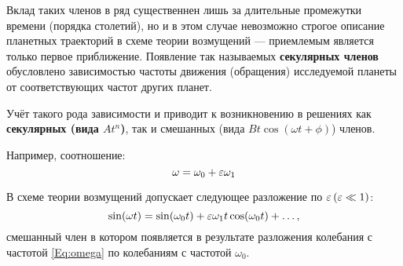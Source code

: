 Вклад таких членов в ряд существеннен лишь
за длительные промежутки времени (порядка столетий),
но и в этом случае невозможно строгое описание планетных
траекторий в схеме теории возмущений ---
приемлемым является только первое приближение.
Появление так называемых \textbf{секулярных членов}
обусловлено зависимостью частоты движения (обращения)
исследуемой планеты от соответствующих частот других планет.


Учёт такого рода зависимости и
приводит к возникновению в решениях
как \textbf{секулярных (вида $A t^n$)},
так и смешанных (вида $B t \cos(\omega t + \phi)$) членов.

Например, соотношение:
\begin{equation} \label{Eq:omega}
    \omega = \omega_0 + \varepsilon \omega_1 
\end{equation}

В схеме теории возмущений допускает
следующее разложение по $\varepsilon \, (\varepsilon \ll 1)$:
\begin{equation*}
    \sin(\omega t) = \sin(\omega_0 t) +
    \varepsilon \omega_1 t \cos(\omega_0 t) + \dots,
\end{equation*}
смешанный член в котором появляется в результате разложения
колебания с частотой \eqref{Eq:omega}
по колебаниям с частотой $\omega_0$.

